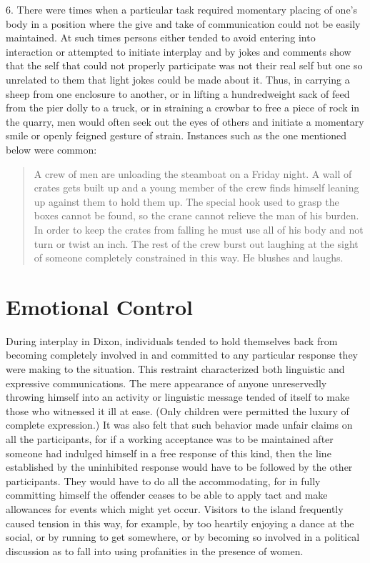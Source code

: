\documentclass[openany,nobib]{tufte-book}
\begin{document}
6. There were times when a particular task required momentary placing of
one's body in a position where the give and take of communication could
not be easily maintained. At such times persons either tended to avoid
entering into interaction or attempted to initiate interplay and by
jokes and comments show that the self that could not properly
participate was not their real self but one so unrelated to them that
light jokes could be made about it. Thus, in carrying a sheep from one
enclosure to another, or in lifting a hundredweight sack of feed from
the pier dolly to a truck, or in straining a crowbar to free a piece of
rock in the quarry, men would often seek out the eyes of others and
initiate a momentary smile or openly feigned gesture of strain.
Instances such as the one mentioned below were common:

\begin{quote}
A crew of men are unloading the steamboat on a Friday night. A wall of
crates gets built up and a young member of the crew finds himself
leaning up against them to hold them up. The special hook used to grasp
the boxes cannot be found, so the crane cannot relieve the man of his
burden. In order to keep the crates from falling he must use all of his
body and not turn or twist an inch. The rest of the crew burst out
laughing at the sight of someone completely constrained in this way. He
blushes and laughs.
\end{quote}

\hypertarget{emotional-control}{%
\section{Emotional Control}\label{emotional-control}}

During interplay in Dixon, individuals tended to hold themselves back
from becoming completely involved in and committed to any particular
response they were making to the situation. This restraint characterized
both linguistic and expressive communications. The mere appearance of
anyone unreservedly throwing himself into an activity or linguistic
message tended of itself to make those who witnessed it ill at ease.
(Only children were permitted the luxury of complete expression.) It was
also felt that such behavior made unfair claims on all the participants,
for if a working acceptance was to be maintained after someone had
indulged himself in a free response of this kind, then the line
established by the uninhibited response would have to be followed by the
other participants. They would have to do all the accommodating, for in
fully committing himself the offender ceases to be able to apply tact
and make allowances for events which might yet occur. Visitors to the
island frequently caused tension in this way, for example, by too
heartily enjoying a dance at the social, or by running to get somewhere,
or by becoming so involved in a political discussion as to fall into
using profanities in the presence of women.
\end{document}
